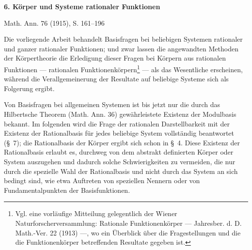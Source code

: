 ﻿%

\begin{center}
{\Large\bfseries 6. Körper und Systeme rationaler Funktionen}\par
\vspace{1.2em}
Math. Ann. 76 (1915), S. 161--196
\end{center}

\vspace{2em}

Die vorliegende Arbeit behandelt Basisfragen bei beliebigen Systemen rationaler und ganzer rationaler Funktionen; und zwar lassen die angewandten Methoden der Körpertheorie die Erledigung dieser Fragen bei Körpern aus rationalen Funktionen --- rationalen Funktionenkörpern\footnote{Vgl. eine vorläufige Mitteilung gelegentlich der Wiener Naturforscherversammlung: Rationale Funktionenkörper --- Jahresber. d. D. Math.-Ver. 22 (1913) ---, wo ein Überblick über die Fragestellungen und die die Funktionenkörper betreffenden Resultate gegeben ist.} --- als das Wesentliche erscheinen, während die Verallgemeinerung der Resultate auf beliebige Systeme sich als Folgerung ergibt.

Von Basisfragen bei allgemeinen Systemen ist bis jetzt nur die durch das Hilbertsche Theorem (Math. Ann. 36) gewährleistete Existenz der Modulbasis bekannt. Im folgenden wird die Frage der rationalen Darstellbarkeit mit der Existenz der Rationalbasis für jedes beliebige System vollständig beantwortet (\S\ 7); die Rationalbasis der Körper ergibt sich schon in \S\ 4. Diese Existenz der Rationalbasis erlaubt es, durchweg von dem abstrakt definierten Körper oder System auszugehen und dadurch solche Schwierigkeiten zu vermeiden, die nur durch die spezielle Wahl der Rationalbasis und nicht durch das System an sich bedingt sind, wie etwa Auftreten von speziellen Nennern oder von Fundamentalpunkten der Basisfunktionen.


